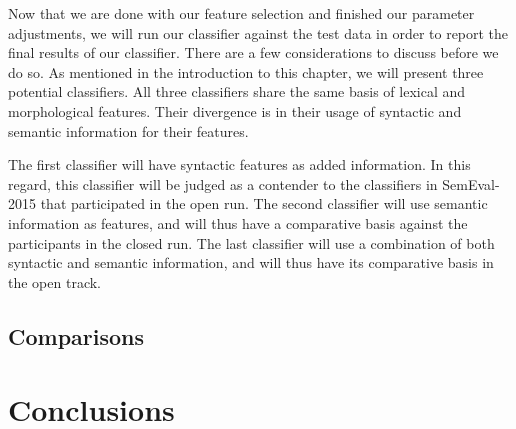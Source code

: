 Now that we are done with our feature selection and finished our parameter adjustments, we will run our classifier against the test data in order to report the final results of our classifier. There are a few considerations to discuss before we do so. As mentioned in the introduction to this chapter, we will present three potential classifiers. All three classifiers share the same basis of lexical and morphological features. Their divergence is in their usage of syntactic and semantic information for their features. 

The first classifier will have syntactic features as added information. In this regard, this classifier will be judged as a contender to the classifiers in SemEval-2015 that participated in the open run. The second classifier will use semantic information as features, and will thus have a comparative basis against the participants in the closed run. The last classifier will use a combination of both syntactic and semantic information, and will thus have its comparative basis in the open track.

\subsection{Comparisons}
\label{comparisons}

\section{Conclusions}
